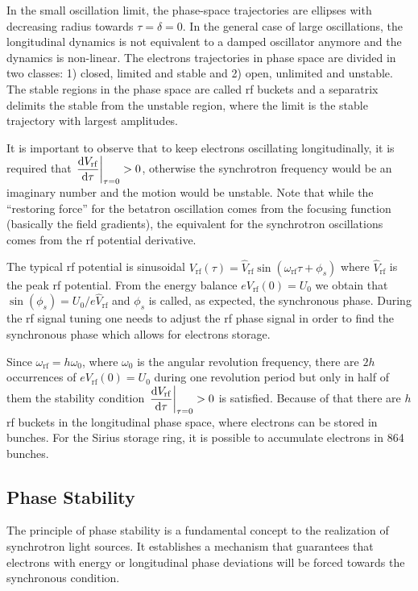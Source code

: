 In the small oscillation limit, the phase-space trajectories are ellipses with decreasing radius towards $\tau = \delta = 0$. In the general case of large oscillations, the longitudinal dynamics is not equivalent to a damped oscillator anymore and the dynamics is non-linear. The electrons trajectories in phase space are divided in two classes: 1) closed, limited and stable and 2) open, unlimited and unstable. The stable regions in the phase space are called \gls{rf} buckets and a separatrix delimits the stable from the unstable region, where the limit is the stable trajectory with largest amplitudes.

It is important to observe that to keep electrons oscillating longitudinally, it is required that $\left.\dfrac{\mathrm{d} V_{\mathrm{rf}}}{\mathrm{d} \tau}\right|_{\tau = 0} > 0$, otherwise the synchrotron frequency would be an imaginary number and the motion would be unstable. Note that while the ``restoring force'' for the betatron oscillation comes from the focusing function (basically the field gradients), the equivalent for the synchrotron oscillations comes from the \gls{rf} potential derivative.

The typical \gls{rf} potential is sinusoidal $V_{\mathrm{rf}}(\tau) = \hat{V}_{\mathrm{rf}} \sin \left(\omega_{\mathrm{rf}}\tau + \phi_s\right)$ where $\hat{V}_{\mathrm{rf}}$ is the peak \gls{rf} potential. From the energy balance $eV_{\mathrm{rf}}(0) = U_0$ we obtain that $\sin(\phi_s) = U_0/e\hat{V}_{\mathrm{rf}}$ and $\phi_s$ is called, as expected, the synchronous phase. During the \gls{rf} signal tuning one needs to adjust the \gls{rf} phase signal in order to find the synchronous phase which allows for electrons storage.

Since $\omega_{\mathrm{rf}} = h \omega_0$, where $\omega_0$ is the angular revolution frequency, there are $2h$ occurrences of $eV_{\mathrm{rf}}(0) = U_0$ during one revolution period but only in half of them the stability condition $\left.\dfrac{\mathrm{d} V_{\mathrm{rf}}}{\mathrm{d} \tau}\right|_{\tau = 0} > 0$ is satisfied. Because of that there are $h$ \gls{rf} buckets in the longitudinal phase space, where electrons can be stored in bunches. For the Sirius storage ring, it is possible to accumulate electrons in 864 bunches.
\subsection{Phase Stability}
The principle of phase stability is a fundamental concept to the realization of synchrotron light sources. It establishes a mechanism that guarantees that electrons with energy or longitudinal phase deviations will be forced towards the synchronous condition.

